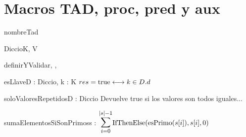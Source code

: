 \documentclass{article}
\begin{document}
\section{Macros TAD, proc, pred y aux}



\par
\begin{tad}{nombreTad}{}

\end{tad}

\par
\begin{tad}{Diccio}{K, V}

\begin{proc}{definirYValidar}{, , }{\tbool}

\end{proc}

\begin{pred}{esLlave}{D : Diccio, k : K}
$res = \mathrm{true} \longleftrightarrow k \in D.d$
\end{pred}

\begin{pred}{soloValoresRepetidos}{D : Diccio}
Devuelve true si los valores son todos iguales...
\end{pred}

\begin{aux}{sumaElementosSiSonPrimos}{s : \tseq{\tint}}{\tint}
$\bigsum{i=0}{|s|-1} \IfThenElse{\call{esPrimo}{s[i]}}{s[i]}{0}$
\end{aux}
\end{tad}

\pagebreak
\end{document}
